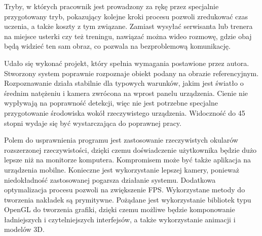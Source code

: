 \documentclass[12pt,twoside,polish]{article}
\begin{document}
Tryby, w których pracownik jest prowadzony za rękę przez specjalnie przygotowany tryb, pokazujący kolejne kroki procesu pozwoli zredukować czas uczenia, a także koszty z tym związane. Zamiast wysyłać serwisanta lub trenera na miejsce usterki czy też treningu, nawiązać można wideo rozmowę, gdzie obaj będą widzieć ten sam obraz, co pozwala na bezproblemową komunikację.

Udało się wykonać projekt, który spełnia wymagania postawione przez autora. Stworzony system poprawnie rozpoznaje obiekt podany na obrazie referencyjnym. Rozpoznawanie działa stabilnie dla typowych warunków, jakim jest światło o średnim natężeniu i kamera zwrócona na wprost panelu urządzenia. Cienie nie wypływają na poprawność detekcji, więc nie jest potrzebne specjalne przygotowanie środowiska wokół rzeczywistego urządzenia. Widoczność do 45 stopni wydaje się być wystarczająca do poprawnej pracy.

Polem do usprawnienia programu jest zastosowanie rzeczywistych okularów rozszerzonej rzeczywistości, dzięki czemu doświadczenie użytkownika będzie dużo lepsze niż na monitorze komputera. Kompromisem może być także aplikacja na urządzenia mobilne. Konieczne jest wykorzystanie lepszej kamery, ponieważ niedokładność zastosowanej pogarsza działanie systemu. Dodatkowa optymalizacja procesu pozwoli na zwiększenie FPS. Wykorzystane metody do tworzenia nakładek są prymitywne. Pożądane jest wykorzystanie bibliotek typu OpenGL do tworzenia grafiki, dzięki czemu możliwe będzie komponowanie ładniejszych i czytelniejszych interfejsów, a także wykorzystanie animacji i modelów 3D.
\clearpage

\end{document}
